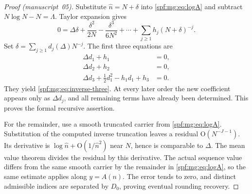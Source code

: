 \documentclass[11pt]{article}
\numberwithin{equation}{section}
\theoremstyle{definition}
\theoremstyle{remark}
\theoremstyle{definition}
\newcommand{\bigO}{\mathrm O}
\begin{document}
\begin{proof}[Proof (manuscript~05)]
Substitute $\hat n=N+\delta$ into \eqref{spf:mg:eq:logA} and subtract
$N\log N-N=\Lambda$. Taylor expansion gives
\begin{equation}
 0=\Delta\delta+\frac{\delta^2}{2N}-\frac{\delta^3}{6N^2}+\cdots
                       +\sum_{j\ge1}h_j(N+\delta)^{-j}.
 \label{spf:mg:eq:inverse-equation}
\end{equation}
Set $\delta=\sum_{j\ge1}d_j(\Delta)N^{-j}$. The first three equations are
\begin{align*}
 \Delta d_1+h_1&=0,\\
 \Delta d_2+h_2&=0,\\
 \Delta d_3+\tfrac12d_1^2-h_1d_1+h_3&=0.
\end{align*}
They yield \eqref{spf:mg:eq:inverse-three}. At every later order the new
coefficient appears only as $\Delta d_j$, and all remaining terms have
already been determined. This proves the formal recursive assertion.

For the remainder, use a smooth truncated carrier from
\eqref{spf:mg:eq:logA}. Substitution of the computed inverse truncation leaves
a residual $\bigO(N^{-J-1})$. Its derivative is
$\log \hat n+\bigO(1/\hat n^2)$ near $N$, hence is comparable to $\Delta$.
The mean value theorem divides the residual by this derivative.
The actual sequence value differs from the same smooth carrier by the
remainder in \eqref{spf:mg:eq:logA}, so the same estimate applies along $y=A(n)$.
The error tends to zero, and distinct admissible indices are separated
by $D_0$, proving eventual rounding recovery.
\end{proof}
\end{document}
